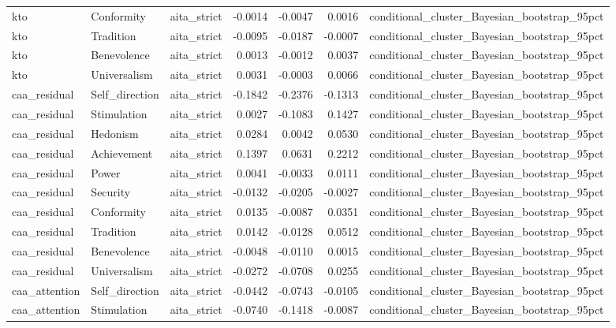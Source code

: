 \begin{tabular}{lllrrrl}
kto & Conformity & aita\_strict & -0.0014 & -0.0047 & 0.0016 & conditional\_cluster\_Bayesian\_bootstrap\_95pct \\
kto & Tradition & aita\_strict & -0.0095 & -0.0187 & -0.0007 & conditional\_cluster\_Bayesian\_bootstrap\_95pct \\
kto & Benevolence & aita\_strict & 0.0013 & -0.0012 & 0.0037 & conditional\_cluster\_Bayesian\_bootstrap\_95pct \\
kto & Universalism & aita\_strict & 0.0031 & -0.0003 & 0.0066 & conditional\_cluster\_Bayesian\_bootstrap\_95pct \\
caa\_residual & Self\_direction & aita\_strict & -0.1842 & -0.2376 & -0.1313 & conditional\_cluster\_Bayesian\_bootstrap\_95pct \\
caa\_residual & Stimulation & aita\_strict & 0.0027 & -0.1083 & 0.1427 & conditional\_cluster\_Bayesian\_bootstrap\_95pct \\
caa\_residual & Hedonism & aita\_strict & 0.0284 & 0.0042 & 0.0530 & conditional\_cluster\_Bayesian\_bootstrap\_95pct \\
caa\_residual & Achievement & aita\_strict & 0.1397 & 0.0631 & 0.2212 & conditional\_cluster\_Bayesian\_bootstrap\_95pct \\
caa\_residual & Power & aita\_strict & 0.0041 & -0.0033 & 0.0111 & conditional\_cluster\_Bayesian\_bootstrap\_95pct \\
caa\_residual & Security & aita\_strict & -0.0132 & -0.0205 & -0.0027 & conditional\_cluster\_Bayesian\_bootstrap\_95pct \\
caa\_residual & Conformity & aita\_strict & 0.0135 & -0.0087 & 0.0351 & conditional\_cluster\_Bayesian\_bootstrap\_95pct \\
caa\_residual & Tradition & aita\_strict & 0.0142 & -0.0128 & 0.0512 & conditional\_cluster\_Bayesian\_bootstrap\_95pct \\
caa\_residual & Benevolence & aita\_strict & -0.0048 & -0.0110 & 0.0015 & conditional\_cluster\_Bayesian\_bootstrap\_95pct \\
caa\_residual & Universalism & aita\_strict & -0.0272 & -0.0708 & 0.0255 & conditional\_cluster\_Bayesian\_bootstrap\_95pct \\
caa\_attention & Self\_direction & aita\_strict & -0.0442 & -0.0743 & -0.0105 & conditional\_cluster\_Bayesian\_bootstrap\_95pct \\
caa\_attention & Stimulation & aita\_strict & -0.0740 & -0.1418 & -0.0087 & conditional\_cluster\_Bayesian\_bootstrap\_95pct \\

\end{tabular}
